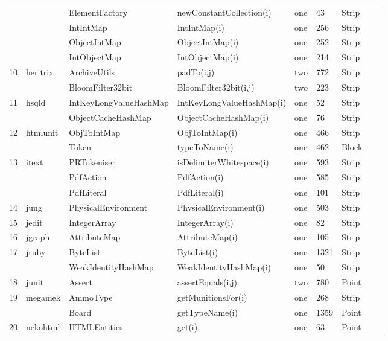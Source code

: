 \documentclass[runningheads,a4paper]{llncs}
\begin{document}
\begin{table}[h]
{\begin{tabular}{|l|l|l|l|l|l|l|l|l|}
	&				& ElementFactory			& newConstantCollection(i)& one		& 43	& Strip  										 \\ 
	&				& IntIntMap				& IntIntMap(i)			& one		& 256	& Strip										\\ 
	&				& ObjectIntMap			& ObjectIntMap(i)			& one		& 252	& Strip 										\\ 
	&				& IntObjectMap			& IntObjectMap(i)			& one		& 214	& Strip 										\\ 
10	&	heritrix		& ArchiveUtils			& padTo(i,j)				& two		& 772	& Strip  										\\ 
	&				& BloomFilter32bit 		& BloomFilter32bit(i,j)		& two 		& 223	& Strip  										\\ 
11	&	hsqld		& IntKeyLongValueHashMap& IntKeyLongValueHashMap(i)& one	& 52	& Strip 										\\ 
	&				& ObjectCacheHashMap	& ObjectCacheHashMap(i)	& one		& 76	& Strip   										\\ 
12	&	htmlunit		& ObjToIntMap			& ObjToIntMap(i)			& one		& 466	& Strip  										\\ 
	&				& Token					& typeToName(i)			& one		& 462	& Block 										\\ 
13	&	itext		& PRTokeniser			& isDelimiterWhitespace(i)	& one		& 593	& Strip  										\\ 
	&				& PdfAction				& PdfAction(i)			& one		& 585	& Strip  										\\ 
	&				& PdfLiteral				& PdfLiteral(i)			& one		& 101	& Strip 										\\ 
14	&	jung		& PhysicalEnvironment	& PhysicalEnvironment(i)	& one		& 503	& Strip 										\\ 
15	&	jedit		& IntegerArray			& IntegerArray(i)			& one		& 82	& Strip  										\\ 
16	&	jgraph		& AttributeMap			& AttributeMap(i)			& one		& 105	& Strip										\\ 
17	&	jruby		& ByteList				& ByteList(i)				& one		& 1321	& Strip 										\\ 
	&				& WeakIdentityHashMap	& WeakIdentityHashMap(i)	& one		& 50	& Strip 										\\ 
18	&	junit		& Assert					& assertEquals(i,j)		& two		& 780	& Point 										\\ 
19	&	megamek	& AmmoType			& getMunitionsFor(i)		& one		& 268	& Strip	  									\\ 			
	&				& Board					& getTypeName(i)		& one		& 1359	& Point 										\\ 
20	&	nekohtml	& HTMLEntities			& get(i)					& one		& 63	& Point  										\\ 

\end{tabular}}
\end{table}
\end{document}
